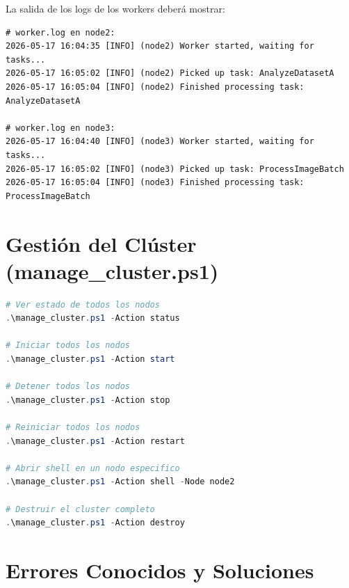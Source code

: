 \documentclass[12pt,a4paper]{article}
\begin{document}
La salida de los logs de los workers deberá mostrar:

\begin{lstlisting}[language={}, title=Ejemplo de salida exitosa]
# worker.log en node2:
2026-05-17 16:04:35 [INFO] (node2) Worker started, waiting for tasks...
2026-05-17 16:05:02 [INFO] (node2) Picked up task: AnalyzeDatasetA
2026-05-17 16:05:04 [INFO] (node2) Finished processing task: AnalyzeDatasetA

# worker.log en node3:
2026-05-17 16:04:40 [INFO] (node3) Worker started, waiting for tasks...
2026-05-17 16:05:02 [INFO] (node3) Picked up task: ProcessImageBatch
2026-05-17 16:05:04 [INFO] (node3) Finished processing task: ProcessImageBatch
\end{lstlisting}

\section{Gestión del Clúster (manage\_cluster.ps1)}

\begin{lstlisting}[language=powershell, title=Comandos de gestión]
# Ver estado de todos los nodos
.\manage_cluster.ps1 -Action status

# Iniciar todos los nodos
.\manage_cluster.ps1 -Action start

# Detener todos los nodos
.\manage_cluster.ps1 -Action stop

# Reiniciar todos los nodos
.\manage_cluster.ps1 -Action restart

# Abrir shell en un nodo especifico
.\manage_cluster.ps1 -Action shell -Node node2

# Destruir el cluster completo
.\manage_cluster.ps1 -Action destroy
\end{lstlisting}

\section{Errores Conocidos y Soluciones}
\end{document}
